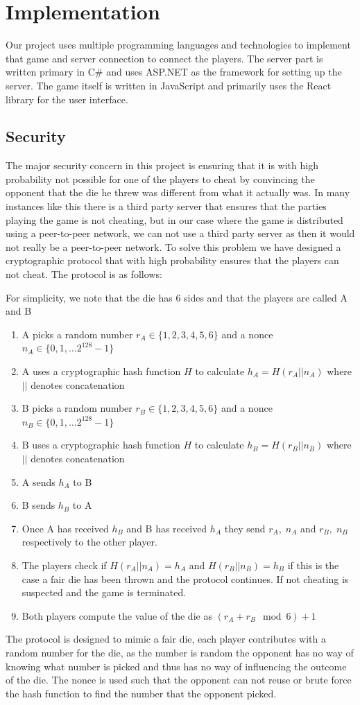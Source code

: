 \documentclass[ twoside,openright,titlepage,numbers=noenddot,headinclude,%
                footinclude=true,cleardoublepage=empty,abstractoff, %
                BCOR=5mm,paper=a4,fontsize=11pt,%
                ngerman,american,%
                ]{scrreprt}
\begin{document}
\section{Implementation}
Our project uses multiple programming languages and technologies to implement that game and server connection to connect the players. The server part is written primary in C\# and uses ASP.NET as the framework for setting up the server. The game itself is written in JavaScript and primarily uses the React library for the user interface.

\subsection{Security}
\label{sec:security}
The major security concern in this project is ensuring that it is with high probability not possible for one of the players to cheat by convincing the opponent that the die he threw was different from what it actually was. In many instances like this there is a third party server that ensures that the parties playing the game is not cheating, but in our case where the game is distributed using a peer-to-peer network, we can not use a third party server as then it would not really be a peer-to-peer network. To solve this problem we have designed a cryptographic protocol that with high probability ensures that the players can not cheat. The protocol is as follows: 

For simplicity, we note that the die has 6 sides and that the players are called A and B
\begin{enumerate}
  \item A picks a random number $r_A \in \{1,2,3,4,5,6\}$ and a nonce $n_A \in \{0,1,\dots 2^{128}-1\}$
  \item A uses a cryptographic hash function $H$ to calculate $h_A = H(r_A || n_A)$ where $||$ denotes concatenation
  \item B picks a random number $r_B \in \{1,2,3,4,5,6\}$ and a nonce $n_B \in \{0,1,\dots 2^{128}-1\}$
  \item B uses a cryptographic hash function $H$ to calculate $h_B = H(r_B || n_B)$ where $||$ denotes concatenation 
  \item A sends $h_A$ to B
  \item B sends $h_B$ to A
  \item Once A has received $h_B$ and B has received $h_A$ they send $r_A, \; n_A$ and $r_B, \; n_B$ respectively to the other player.
  \item The players check if $H(r_A || n_A) = h_A$ and $H(r_B || n_B) = h_B$ if this is the case a fair die has been thrown and the protocol continues. If not cheating is suspected and the game is terminated.
  \item Both players compute the value of the die as $(r_A + r_B \mod 6) + 1$
\end{enumerate}
The protocol is designed to mimic a fair die, each player contributes with a random number for the die, as the number is random the opponent has no way of knowing what number is picked and thus has no way of influencing the outcome of the die. The nonce is used such that the opponent can not reuse or brute force the hash function to find the number that the opponent picked.
\end{document}
